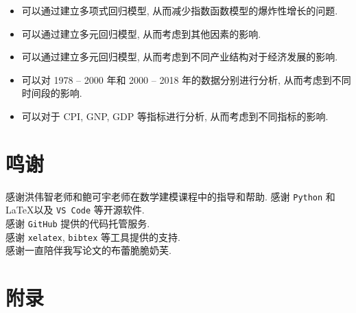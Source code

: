 \documentclass{article}
\begin{document}
\begin{itemize}
  \item 可以通过建立多项式回归模型, 从而减少指数函数模型的爆炸性增长的问题.
  \item 可以通过建立多元回归模型, 从而考虑到其他因素的影响.
  \item 可以通过建立多元回归模型, 从而考虑到不同产业结构对于经济发展的影响.
  \item 可以对 1978 -- 2000 年和 2000 -- 2018 年的数据分别进行分析, 从而考虑到不同时间段的影响.
  \item 可以对于 CPI, GNP, GDP 等指标进行分析, 从而考虑到不同指标的影响.
\end{itemize}

\section*{鸣谢}

感谢洪伟智老师和鲍可宇老师在数学建模课程中的指导和帮助. 感谢 \texttt{Python} 和 \LaTeX 以及 \texttt{VS Code} 等开源软件.\\
\indent 感谢 \texttt{GitHub} 提供的代码托管服务.\\
\indent 感谢 \texttt{xelatex}, \texttt{bibtex} 等工具提供的支持.\\
\indent 感谢一直陪伴我写论文的布蕾脆脆奶芙.

{}

\cite{周星2012男生追女生的数学模型}
\cite{张长生2013改革开放以来中国居民人均收入增长与}
\cite{华罗庚2011数学模型选谈}
\cite{刘伟2008中国经济增长中的产业结构变迁和技术进步}
\cite{刘来福2009数学模型与数学建模}

\section*{附录}
\end{document}
